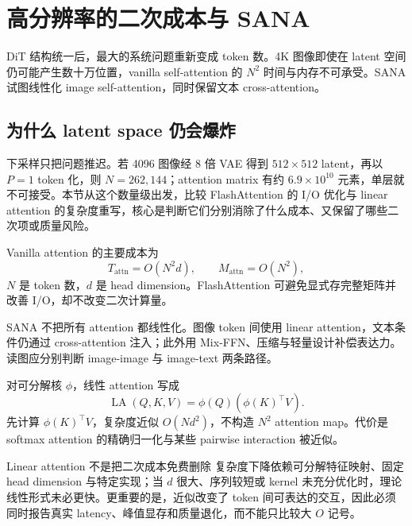 \section{高分辨率的二次成本与 SANA}

DiT 结构统一后，最大的系统问题重新变成 token 数。4K 图像即使在 latent 空间仍可能产生数十万位置，vanilla self-attention 的 $N^2$ 时间与内存不可承受。SANA 试图线性化 image self-attention，同时保留文本 cross-attention。

\subsection{为什么 latent space 仍会爆炸}

下采样只把问题推迟。若 4096 图像经 8 倍 VAE 得到 $512\times512$ latent，再以 $P=1$ token 化，则 $N=262{,}144$；attention matrix 有约 $6.9\times10^{10}$ 元素，单层就不可接受。本节从这个数量级出发，比较 FlashAttention 的 I/O 优化与 linear attention 的复杂度重写，核心是判断它们分别消除了什么成本、又保留了哪些二次项或质量风险。


Vanilla attention 的主要成本为
\[
T_{\mathrm{attn}}=O(N^2d),\qquad
M_{\mathrm{attn}}=O(N^2),
\]
$N$ 是 token 数，$d$ 是 head dimension。FlashAttention 可避免显式存完整矩阵并改善 I/O，却不改变二次计算量。


SANA 不把所有 attention 都线性化。图像 token 间使用 linear attention，文本条件仍通过 cross-attention 注入；此外用 Mix-FFN、压缩与轻量设计补偿表达力。读图应分别判断 image-image 与 image-text 两条路径。


对可分解核 $\phi$，线性 attention 写成
\[
\operatorname{LA}(Q,K,V)
=\phi(Q)\left(\phi(K)^\top V\right).
\]
先计算 $\phi(K)^\top V$，复杂度近似 $O(Nd^2)$，不构造 $N^2$ attention map。代价是 softmax attention 的精确归一化与某些 pairwise interaction 被近似。

\begin{warningbox}{Linear attention 不是把二次成本免费删除}
复杂度下降依赖可分解特征映射、固定 head dimension 与特定实现；当 $d$ 很大、序列较短或 kernel 未充分优化时，理论线性形式未必更快。更重要的是，近似改变了 token 间可表达的交互，因此必须同时报告真实 latency、峰值显存和质量退化，而不能只比较大 $O$ 记号。
\end{warningbox}

